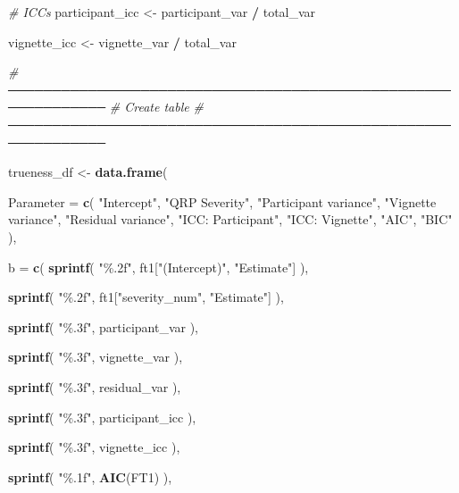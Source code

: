 \documentclass[
]{article}
\newenvironment{Shaded}{\begin{snugshade}}{\end{snugshade}}
\newcommand{\AttributeTok}[1]{\textcolor[rgb]{0.13,0.29,0.53}{#1}}
\newcommand{\CommentTok}[1]{\textcolor[rgb]{0.56,0.35,0.01}{\textit{#1}}}
\newcommand{\FunctionTok}[1]{\textcolor[rgb]{0.13,0.29,0.53}{\textbf{#1}}}
\newcommand{\NormalTok}[1]{#1}
\newcommand{\OtherTok}[1]{\textcolor[rgb]{0.56,0.35,0.01}{#1}}
\newcommand{\SpecialCharTok}[1]{\textcolor[rgb]{0.81,0.36,0.00}{\textbf{#1}}}
\newcommand{\StringTok}[1]{\textcolor[rgb]{0.31,0.60,0.02}{#1}}
\begin{document}
\begin{Shaded}
\begin{Highlighting}[]
\CommentTok{\# ICCs}
\NormalTok{participant\_icc }\OtherTok{\textless{}{-}}
\NormalTok{  participant\_var }\SpecialCharTok{/}\NormalTok{ total\_var}

\NormalTok{vignette\_icc }\OtherTok{\textless{}{-}}
\NormalTok{  vignette\_var }\SpecialCharTok{/}\NormalTok{ total\_var}


\CommentTok{\# ─────────────────────────────────────────────────────────────}
\CommentTok{\# Create table}
\CommentTok{\# ─────────────────────────────────────────────────────────────}

\NormalTok{trueness\_df }\OtherTok{\textless{}{-}} \FunctionTok{data.frame}\NormalTok{(}

  \AttributeTok{Parameter =} \FunctionTok{c}\NormalTok{(}
    \StringTok{"Intercept"}\NormalTok{,}
    \StringTok{"QRP Severity"}\NormalTok{,}
    \StringTok{"Participant variance"}\NormalTok{,}
    \StringTok{"Vignette variance"}\NormalTok{,}
    \StringTok{"Residual variance"}\NormalTok{,}
    \StringTok{"ICC: Participant"}\NormalTok{,}
    \StringTok{"ICC: Vignette"}\NormalTok{,}
    \StringTok{"AIC"}\NormalTok{,}
    \StringTok{"BIC"}
\NormalTok{  ),}

  \AttributeTok{b =} \FunctionTok{c}\NormalTok{(}
    \FunctionTok{sprintf}\NormalTok{(}
      \StringTok{"\%.2f"}\NormalTok{,}
\NormalTok{      ft1[}\StringTok{"(Intercept)"}\NormalTok{, }\StringTok{"Estimate"}\NormalTok{]}
\NormalTok{    ),}

    \FunctionTok{sprintf}\NormalTok{(}
      \StringTok{"\%.2f"}\NormalTok{,}
\NormalTok{      ft1[}\StringTok{"severity\_num"}\NormalTok{, }\StringTok{"Estimate"}\NormalTok{]}
\NormalTok{    ),}

    \FunctionTok{sprintf}\NormalTok{(}
      \StringTok{"\%.3f"}\NormalTok{,}
\NormalTok{      participant\_var}
\NormalTok{    ),}

    \FunctionTok{sprintf}\NormalTok{(}
      \StringTok{"\%.3f"}\NormalTok{,}
\NormalTok{      vignette\_var}
\NormalTok{    ),}

    \FunctionTok{sprintf}\NormalTok{(}
      \StringTok{"\%.3f"}\NormalTok{,}
\NormalTok{      residual\_var}
\NormalTok{    ),}

    \FunctionTok{sprintf}\NormalTok{(}
      \StringTok{"\%.3f"}\NormalTok{,}
\NormalTok{      participant\_icc}
\NormalTok{    ),}

    \FunctionTok{sprintf}\NormalTok{(}
      \StringTok{"\%.3f"}\NormalTok{,}
\NormalTok{      vignette\_icc}
\NormalTok{    ),}

    \FunctionTok{sprintf}\NormalTok{(}
      \StringTok{"\%.1f"}\NormalTok{,}
      \FunctionTok{AIC}\NormalTok{(FT1)}
\NormalTok{    ),}


\end{Highlighting}
\end{Shaded}
\end{document}
